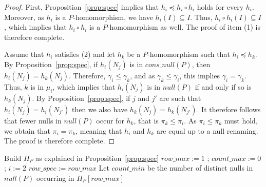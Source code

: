 \begin{proof}
    First, Proposition~\ref{prop:spec} implies that $h_i \preceq h_i \circ h_i$ holds for every $h_i$.
    Moreover, as $h_i$ is a $P$-homomorphism, we have $h_i(I) \subseteq I$.
    Thus, $h_i \circ h_i(I) \subseteq I$, which implies that $h_i \circ h_i$ is a $P$-homomorphism as well.
    The proof of item (1) is therefore complete.

    Assume that $h_i$ satisfies (2) and let $h_k$ be a $P$-homomorphism such that $h_i \preceq h_k$.
    By Proposition~\ref{prop:spec}, if $h_i(N_j)$ is in $cons\_null(P)$, then $h_i(N_j)=h_k(N_j)$.
    Therefore, $\gamma_i \leq \gamma_k$, and as $\gamma_k \leq \gamma_i$, this implies $\gamma_i = \gamma_k$.
    Thus, $k$ is in $\mu_i$, which implies that $h_i(N_j)$ is in $null(P)$ if and only if so is $h_k(N_j)$.
    By Proposition~\ref{prop:spec}, if $j$ and $j'$ are such that $h_i(N_j)=h_i(N_{j'})$ then we also have $h_k(N_j)=h_k(N_{j'})$.
    It therefore follows that fewer nulls in $null(P)$ occur for $h_k$, that is $\pi_k \leq \pi_i$.
    As $\pi_i \leq \pi_k$ must hold, we obtain that $\pi_i = \pi_k$, meaning that $h_i$ and $h_k$ are equal up to a null renaming.
    The proof is therefore complete.
\end{proof}

\begin{procedure}[htb]
    \label{mostspecific}


    Build $H_P$ as explained in Proposition~\ref{prop:spec}\;
    $row\_max := 1$ ; $count\_max := 0$ ; $i := 2$\;
    $row\_spec := row\_max$\;
    Let $count\_min$ be the number of distinct nulls in $null(P)$ occurring in $H_P[row\_max]$\;
    \;
\end{procedure}

